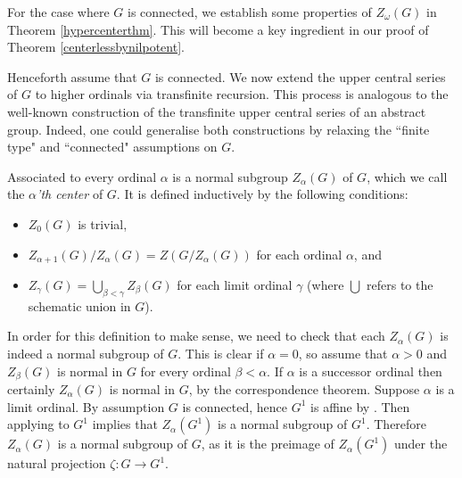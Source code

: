 \documentclass[twoside,a4paper,reqno,11pt]{amsart}
\theoremstyle{definition}
\begin{document}
\vspace{1mm}\noindent For the case where $G$ is connected, we establish some properties of $Z_\omega(G)$ in Theorem \ref{hypercenterthm}. This will become a key ingredient in our proof of Theorem \ref{centerlessbynilpotent}. %

\vspace{2mm}\noindent Henceforth assume that $G$ is connected. We now extend the upper central series of $G$ to higher ordinals via transfinite recursion. This process is analogous to the well-known construction of the transfinite upper central series of an abstract group. Indeed, one could generalise both constructions by relaxing the ``finite type" and ``connected" assumptions on $G$. %

\vspace{2mm}\noindent Associated to every ordinal $\alpha$ is a normal subgroup $Z_\alpha(G)$ of $G$, which we call the \textit{$\alpha$'th center} of $G$. It is defined inductively by the following conditions: \begin{itemize}\item $Z_0(G)$ is trivial, \vspace{1mm}\item  $Z_{\alpha+1}(G)/Z_{\alpha}(G)=Z(G/Z_{\alpha}(G))$ for each ordinal $\alpha$, and \vspace{0.8mm}\item $Z_\gamma(G)=\bigcup_{\beta<\gamma}Z_\beta(G)$ for each limit ordinal $\gamma$ (where $\bigcup$ refers to the schematic union in $G$).\end{itemize}

\vspace{1mm}\noindent In order for this definition to make sense, we need to check that each $Z_\alpha(G)$ is indeed a normal subgroup of $G$. This is clear if $\alpha=0$, so assume that $\alpha>0$ and $Z_\beta(G)$ is normal in $G$ for every ordinal $\beta<\alpha$. If $\alpha$ is a successor ordinal then certainly $Z_\alpha(G)$ is normal in $G$, by the correspondence theorem. Suppose $\alpha$ is a limit ordinal. By assumption $G$ is connected, hence $G^1$ is affine by \cite[Cor.\ 8.11]{Mi}. %
Then applying \cite[Prop.\ 2.2]{S} to $G^1$ implies that $Z_\alpha(G^1)$ is a normal subgroup of $G^1$. Therefore $Z_\alpha(G)$ is a normal subgroup of $G$, as it is the preimage of $Z_\alpha(G^1)$ under the natural projection $\zeta:G\to G^1$.
\end{document}
